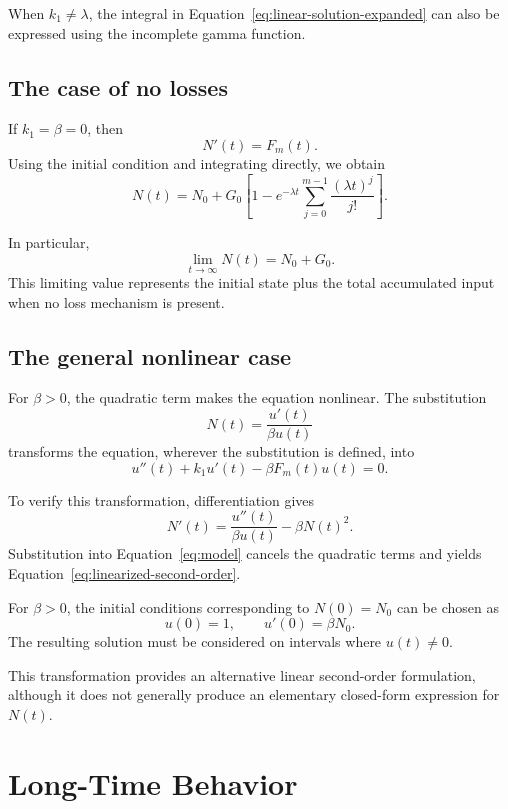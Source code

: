 \documentclass[12pt]{article}
\theoremstyle{definition}
\theoremstyle{remark}
\begin{document}
When \(k_1\neq\lambda\), the integral in
Equation~\eqref{eq:linear-solution-expanded} can also
be expressed using the incomplete gamma function.

\subsection{The case of no losses}

If \(k_1=\beta=0\), then
\[
N'(t)=F_m(t).
\]
Using the initial condition and integrating directly,
we obtain
\begin{equation}
N(t)
=
N_0+
G_0\left[
1-e^{-\lambda t}
\sum_{j=0}^{m-1}\frac{(\lambda t)^j}{j!}
\right].
\label{eq:no-loss-solution}
\end{equation}

In particular,
\[
\lim_{t\to\infty}N(t)=N_0+G_0.
\]
This limiting value represents the initial state plus
the total accumulated input when no loss mechanism
is present.

\subsection{The general nonlinear case}

For \(\beta>0\), the quadratic term makes the equation
nonlinear. The substitution
\[
N(t)=\frac{u'(t)}{\beta u(t)}
\]
transforms the equation, wherever the substitution is
defined, into
\begin{equation}
u''(t)+k_1u'(t)-\beta F_m(t)u(t)=0.
\label{eq:linearized-second-order}
\end{equation}

To verify this transformation, differentiation gives
\[
N'(t)
=
\frac{u''(t)}{\beta u(t)}
-\beta N(t)^2.
\]
Substitution into Equation~\eqref{eq:model} cancels
the quadratic terms and yields
Equation~\eqref{eq:linearized-second-order}.

For \(\beta>0\), the initial conditions corresponding
to \(N(0)=N_0\) can be chosen as
\[
u(0)=1,\qquad u'(0)=\beta N_0.
\]
The resulting solution must be considered on intervals
where \(u(t)\neq 0\).

This transformation provides an alternative linear
second-order formulation, although it does not generally
produce an elementary closed-form expression for \(N(t)\).

\section{Long-Time Behavior}
\end{document}
